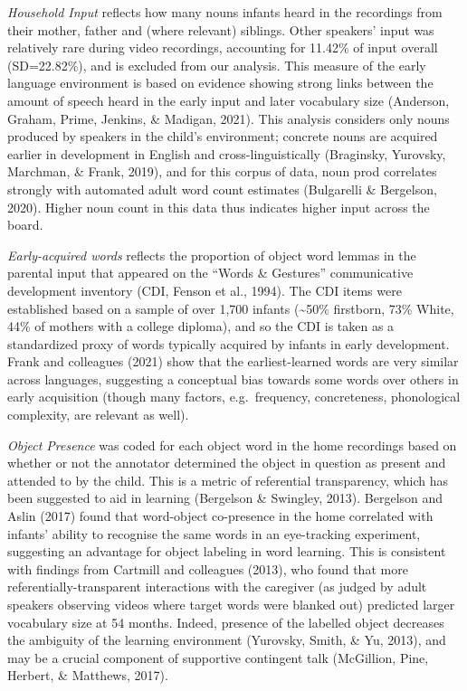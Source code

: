 \documentclass[
  english,
  man,floatsintext]{apa6}
\begin{document}
\emph{Household Input} reflects how many nouns infants heard in the recordings from their mother, father and (where relevant) siblings. Other speakers' input was relatively rare during video recordings, accounting for 11.42\% of input overall (SD=22.82\%), and is excluded from our analysis. This measure of the early language environment is based on evidence showing strong links between the amount of speech heard in the early input and later vocabulary size (Anderson, Graham, Prime, Jenkins, \& Madigan, 2021). This analysis considers only nouns produced by speakers in the child's environment; concrete nouns are acquired earlier in development in English and cross-linguistically (Braginsky, Yurovsky, Marchman, \& Frank, 2019), and for this corpus of data, noun prod correlates strongly with automated adult word count estimates (Bulgarelli \& Bergelson, 2020). Higher noun count in this data thus indicates higher input across the board.

\emph{Early-acquired words} reflects the proportion of object word lemmas in the parental input that appeared on the \enquote{Words \& Gestures} communicative development inventory (CDI, Fenson et al., 1994). The CDI items were established based on a sample of over 1,700 infants (\textasciitilde50\% firstborn, 73\% White, 44\% of mothers with a college diploma), and so the CDI is taken as a standardized proxy of words typically acquired by infants in early development. Frank and colleagues (2021) show that the earliest-learned words are very similar across languages, suggesting a conceptual bias towards some words over others in early acquisition (though many factors, e.g.~frequency, concreteness, phonological complexity, are relevant as well).

\emph{Object Presence} was coded for each object word in the home recordings based on whether or not the annotator determined the object in question as present and attended to by the child. This is a metric of referential transparency, which has been suggested to aid in learning (Bergelson \& Swingley, 2013). Bergelson and Aslin (2017) found that word-object co-presence in the home correlated with infants' ability to recognise the same words in an eye-tracking experiment, suggesting an advantage for object labeling in word learning. This is consistent with findings from Cartmill and colleagues (2013), who found that more referentially-transparent interactions with the caregiver (as judged by adult speakers observing videos where target words were blanked out) predicted larger vocabulary size at 54 months. Indeed, presence of the labelled object decreases the ambiguity of the learning environment (Yurovsky, Smith, \& Yu, 2013), and may be a crucial component of supportive contingent talk (McGillion, Pine, Herbert, \& Matthews, 2017).
\end{document}
